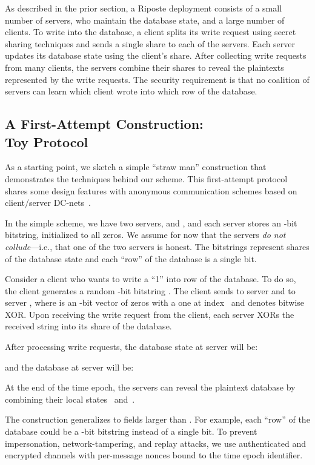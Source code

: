 \documentclass[10pt,twocolumn]{article}
\newcommand{\name}{Riposte\xspace}
\begin{document}
As described in the prior section,
a \name deployment consists of a small number
of servers, who maintain the database state, 
and a large number of clients.
To write into the database, a client
splits its write request using secret sharing
techniques and sends a single share to each of
the servers.
Each server updates its database state using
the client's share.
After collecting write requests from many
clients, the servers
combine their shares to reveal the plaintexts
represented by the write requests.
The security requirement is that 
no coalition of  servers can learn which client
wrote into which row of the database.

\subsection{A First-Attempt Construction:\\Toy Protocol}
\label{sec:arch:straw}

As a starting point, we sketch a simple ``straw man''
construction that demonstrates the techniques
behind our scheme.
This first-attempt protocol shares some design features
with anonymous communication schemes based on 
client/server DC-nets~\cite{chaum1988dining,wolinsky2012dissent}.

In the simple scheme, we have two servers,  and ,
and each server stores an -bit bitstring, initialized to all zeros.
We assume for now that the servers {\em do not collude}---i.e.,
that one of the two servers is honest.
The bitstrings represent shares of the database state
and each ``row'' of the database is a single bit.

Consider a client who wants to write a ``1'' into 
row  of the database.
To do so, the client generates a random -bit bitstring .
The client sends  to server  and  to server ,
where  is an -bit vector of zeros with a one at index~
and  denotes bitwise XOR.
Upon receiving the write request from the client, each server XORs
the received string into its share of the database.

After processing  write requests, the database state at
server  will be:

and the database at server  will be:

At the end of the time epoch, the servers can reveal the plaintext
database by combining their local states ~and~.

The construction generalizes to fields larger than .
For example, each ``row'' of the database could be a -bit bitstring
instead of a single bit.
To prevent impersonation, network-tampering, and replay attacks, we 
use authenticated and encrypted channels with per-message nonces
bound to the time epoch identifier. 
\end{document}
